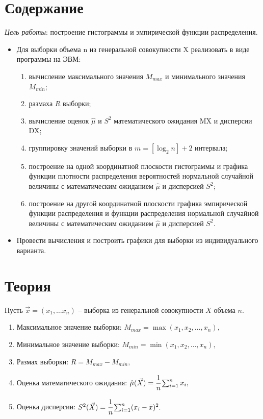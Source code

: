 
\chapter{Содержание}

\textit{Цель работы}: построение гистограммы и эмпирической функции распределения.
\begin{itemize}
	\item Для выборки объема n из генеральной совокупности X реализовать в виде программы на ЭВМ:
	\begin{enumerate}
		\item вычисление максимального значения $M_{max}$ и минимального значения $M_{min}$;
		\item размаха $R$ выборки;
		\item вычисление оценок $\hat{\mu}$ и $S^2$ математического ожидания MX и дисперсии DX;
		\item группировку значений выборки в $m = [\log_2n] + 2$ интервала;
		\item построение на одной координатной плоскости гистограммы и графика функции плотности распределения вероятностей нормальной случайной величины с математическим ожиданием $\hat{\mu}$ и дисперсией $S^2$;
		\item построение на другой координатной плоскости графика эмпирической функции распределения и функции распределения нормальной случайной величины с математическим ожиданием $\hat{\mu}$ и дисперсией $S^2$.
	\end{enumerate}
	\item Провести вычисления и построить графики для выборки из индивидуального варианта.
\end{itemize}


\chapter{Теория}

Пусть $\vec{x} = (x_1, \dots x_n)$ -- выборка из генеральной совокупности $X$ объема $n$.

\begin{enumerate}[wide=0pt]
	\item Максимальное значение выборки: $M_{max} = \max{(x_1, x_2, \dots, x_n)},$

	\item Минимальное значение выборки: $M_{min} = \min{(x_1, x_2, \dots, x_n)},$

	\item Размах выборки: $R = M_{max} - M_{min},$

	\item Оценка математического ожидания: $\hat{\mu}(\vec{X}) = \cfrac{1}{n}\sum_{i = 1}^{n}x_i,$

	\item Оценка дисперсии: $S^2(\vec{X}) = \cfrac{1}{n}\sum_{i = 1}^{n}(x_i - \bar{x})^2.$
\end{enumerate}



